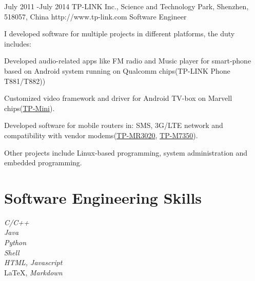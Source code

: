 \documentclass[10pt]{article} %
\begin{document}
\job
{July 2011 -}{July 2014}
{TP-LINK Inc., Science and Technology Park, Shenzhen, 518057, China}
{http://www.tp-link.com}
{Software Engineer}
{I developed software for multiple projects in different platforms, the duty includes:

\begin{itemize-noindent}
\item{Developed audio-related apps like FM radio and Music player for smart-phone based on Android system running on Qualcomm chips(TP-LINK Phone T881/T882))}
\item{Customized video framework and driver for Android TV-box on Marvell chips(\href{http://www.amazon.com/TP-LINK-Android-Built-Support-Playing/dp/B00CRVHIPK}{TP-Mini}).}
\item{Developed software for mobile routers in: SMS, 3G/LTE network and compatibility with vendor modems(\href{http://www.amazon.com/TP-LINK-TL-MR3020-Wireless-Portable-Router/dp/B00634PLTW/ref=sr_1_1?s=electronics&ie=UTF8&qid=1438745356&sr=1-1&keywords=MR3020}{TP-MR3020},  \href{http://www.amazon.com/TP-Link-M7350-LTE-WLAN-routeur/dp/B00PIBBWSK/ref=sr_1_5?s=electronics&ie=UTF8&qid=1438745627&sr=1-5&keywords=M7350}{TP-M7350}).}
\end{itemize-noindent}

Other projects include Linux-based programming, system administration and embedded programming.}


\section{Software Engineering Skills}

{
\textit{C/C++}\\
\textit{Java}\\
\textit{Python}\\
\textit{Shell}\\
\textit{HTML, Javascript}\\
\LaTeX, \textit{Markdown}
}


\end{document}
